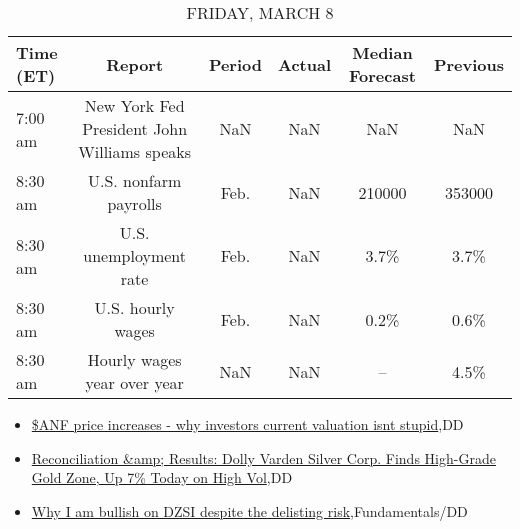 \documentclass{article}%
\begin{document}
%


\begin{table}[htbp]%
\caption{FRIDAY, MARCH 8}%
\centering%
\begin{adjustbox}{width=1\textwidth}%
\begin{tabular}{lccccc}
\toprule
Time (ET) &                                      Report & Period & Actual & Median Forecast & Previous \\
\midrule
  7:00 am & New York Fed President John Williams speaks &    NaN &    NaN &             NaN &      NaN \\
  8:30 am &                       U.S. nonfarm payrolls &   Feb. &    NaN &          210000 &   353000 \\
  8:30 am &                      U.S. unemployment rate &   Feb. &    NaN &            3.7\% &     3.7\% \\
  8:30 am &                           U.S. hourly wages &   Feb. &    NaN &            0.2\% &     0.6\% \\
  8:30 am &                 Hourly wages year over year &    NaN &    NaN &              -- &     4.5\% \\
\bottomrule
\end{tabular}
%
\end{adjustbox}%
\end{table}

%
\begin{itemize}%
\item%
\href{https://reddit.com/r/wallstreetbets/comments/1b4lmh2/anf\_price\_increases\_why\_investors\_current/}{\$ANF price increases - why investors current valuation isnt stupid},DD%
\item%
\href{https://reddit.com/r/Baystreetbets/comments/1b4bdbe/reconciliation\_results\_dolly\_varden\_silver\_corp/}{Reconciliation \&amp; Results: Dolly Varden Silver Corp. Finds High-Grade Gold Zone, Up 7\% Today on High Vol},DD%
\item%
\href{https://reddit.com/r/StockMarket/comments/1b4cddf/why\_i\_am\_bullish\_on\_dzsi\_despite\_the\_delisting/}{Why I am bullish on DZSI despite the delisting risk},Fundamentals/DD%
\end{itemize}%
\end{document}
